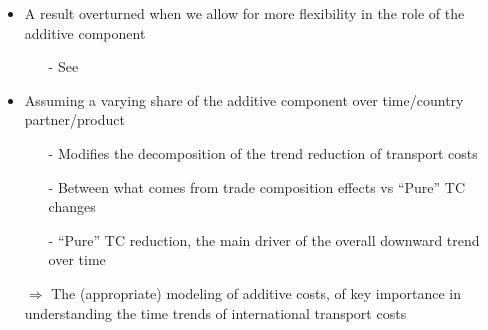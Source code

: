 \documentclass[10 pt,Helvetica, french]{beamer}
\begin{document}
\begin{frame}[label = slide_compeffects_results]
\begin{itemize}
\item A result overturned when we allow for more flexibility in the role of the additive component  \vspace{0.1cm}
\begin{itemize}
\item[-] See \hyperlink{slide_compeffects_figure}{} \vspace{0.1cm}
\end{itemize}
\item Assuming a varying share of the additive component over time/country partner/product  \vspace{0.1cm}

\begin{itemize}
\item[-] Modifies the decomposition of the trend reduction of transport costs \vspace{0.1cm}
\item[-] Between what comes from trade composition effects vs ``Pure'' TC changes \vspace{0.1cm}
\item[-] ``Pure'' TC reduction, the main driver of the overall downward trend over time \vspace{0.1cm}
\end{itemize}
\item[$\Rightarrow$] The (appropriate) modeling of additive costs, of key importance in understanding the time trends of international transport costs
\end{itemize}
\end{frame}
\end{document}

